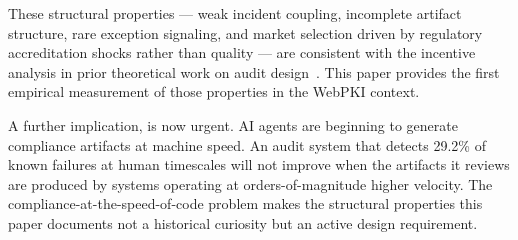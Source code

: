 \documentclass[10pt,twocolumn,letterpaper]{article}
\begin{document}
These structural properties --- weak incident coupling, incomplete
artifact structure, rare exception signaling, and market selection
driven by regulatory accreditation shocks rather than quality ---
are consistent with the incentive analysis in prior theoretical
work on audit design~\cite{hurst2023, hurst2025}. This paper provides
the first empirical measurement of those properties in the WebPKI context.

A further implication,
is now urgent. AI agents are beginning to generate compliance artifacts
at machine speed. An audit system that detects 29.2\% of known failures
at human timescales will not improve when the artifacts it reviews are
produced by systems operating at orders-of-magnitude higher velocity.
The compliance-at-the-speed-of-code problem makes the structural
properties this paper documents not a historical curiosity but an active
design requirement.
\end{document}
